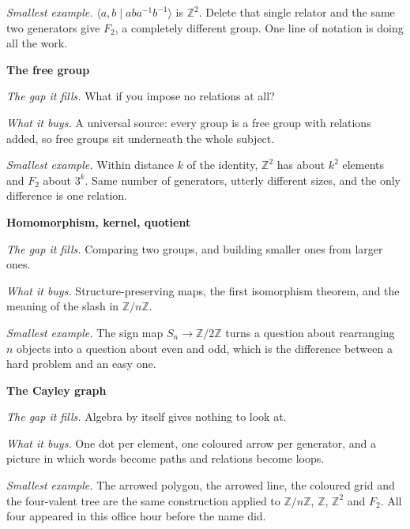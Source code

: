 \documentclass[10pt]{article}
\newcommand{\Z}{\mathbb{Z}}
\newcommand{\inv}{^{-1}}
\begin{document}
{\begin{minipage}[t]{744pt}
\begin{minipage}[t]{238pt}
\emph{Smallest example.} $\langle a,b \mid aba\inv b\inv\rangle$ is $\Z^2$. Delete that single relator and the same two generators give $F_2$, a completely different group. One line of notation is doing all the work.
\end{minipage}\hfill
\begin{minipage}[t]{238pt}\vspace{0pt}
{\sffamily\bfseries\color{big} The free group}\par\vspace{1pt}
\emph{The gap it fills.} What if you impose no relations at all?\par\vspace{1pt}
\emph{What it buys.} A universal source: every group is a free group with relations added, so free groups sit underneath the whole subject.\par\vspace{1pt}
\emph{Smallest example.} Within distance $k$ of the identity, $\Z^2$ has about $k^2$ elements and $F_2$ about $3^k$. Same number of generators, utterly different sizes, and the only difference is one relation.\par\vspace{5pt}
{\sffamily\bfseries\color{big} Homomorphism, kernel, quotient}\par\vspace{1pt}
\emph{The gap it fills.} Comparing two groups, and building smaller ones from larger ones.\par\vspace{1pt}
\emph{What it buys.} Structure-preserving maps, the first isomorphism theorem, and the meaning of the slash in $\Z/n\Z$.\par\vspace{1pt}
\emph{Smallest example.} The sign map $S_n\to\Z/2\Z$ turns a question about rearranging $n$ objects into a question about even and odd, which is the difference between a hard problem and an easy one.\par\vspace{5pt}
{\sffamily\bfseries\color{big} The Cayley graph}\par\vspace{1pt}
\emph{The gap it fills.} Algebra by itself gives nothing to look at.\par\vspace{1pt}
\emph{What it buys.} One dot per element, one coloured arrow per generator, and a picture in which words become paths and relations become loops.\par\vspace{1pt}
\emph{Smallest example.} The arrowed polygon, the arrowed line, the coloured grid and the four-valent tree are the same construction applied to $\Z/n\Z$, $\Z$, $\Z^2$ and $F_2$. All four appeared in this office hour before the name did.
\end{minipage}
\end{minipage}
}
\end{document}
